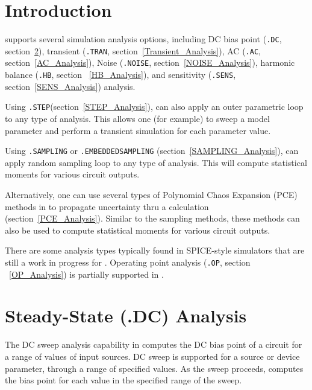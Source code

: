 \section{Introduction}
\label{analysis_intro}

\Xyce{} supports several simulation analysis options, including DC
bias point (\texttt{.DC}, section~\ref{DC_Analysis}), transient
(\texttt{.TRAN}, section~\ref{Transient_Analysis}), AC (\texttt{.AC},
section~\ref{AC_Analysis}), Noise (\texttt{.NOISE},
section~\ref{NOISE_Analysis}), harmonic balance (\texttt{.HB}, section
~\ref{HB_Analysis}), and sensitivity (\texttt{.SENS},
section~\ref{SENS_Analysis}) analysis.

Using \texttt{.STEP}(section~\ref{STEP_Analysis}), \Xyce{} can also
apply an outer parametric loop to any type of analysis. This allows
one (for example) to sweep a model parameter and perform a transient
simulation for each parameter value.

Using \texttt{.SAMPLING} or \texttt{.EMBEDDEDSAMPLING} 
(section~\ref{SAMPLING_Analysis}), \Xyce{} can
apply random sampling loop to any type of analysis.  This will compute
statistical moments for various circuit outputs.

Alternatively, one can use several types of Polynomial Chaos Expansion (PCE) 
methods in \Xyce{} to propagate uncertainty thru a calculation (section~\ref{PCE_Analysis}).
Similar to the sampling methods, these methods can also be used to compute
statistical moments for various circuit outputs.

There are some analysis types typically found in SPICE-style
simulators that are still a work in progress for \Xyce{}. Operating
point analysis (\texttt{.OP}, section ~\ref{OP_Analysis}) is partially
supported in \Xyce{}.

\section{Steady-State (.DC) Analysis}
\label{DC_Analysis}
\label{DC_Sweep_Overview}
 
 

The DC sweep analysis capability in \Xyce{} computes the DC bias point
of a circuit for a range of values of input sources.  DC sweep is
supported for a source or device parameter, through a range of
specified values.  As the sweep proceeds, \Xyce{} computes the bias
point for each value in the specified range of the
sweep.

